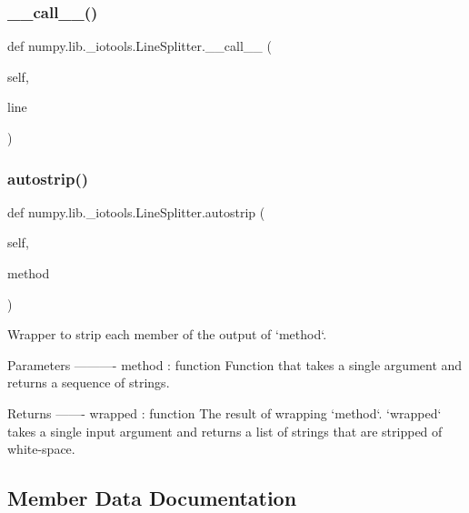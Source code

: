 \subsubsection{\texorpdfstring{\+\_\+\+\_\+call\+\_\+\+\_\+()}{\_\_call\_\_()}}
{\footnotesize\ttfamily def numpy.\+lib.\+\_\+iotools.\+Line\+Splitter.\+\_\+\+\_\+call\+\_\+\+\_\+ (\begin{DoxyParamCaption}\item[{}]{self,  }\item[{}]{line }\end{DoxyParamCaption})}

\mbox{\label{classnumpy_1_1lib_1_1__iotools_1_1LineSplitter_a1b01934e53f08697ddf883dba06e4f47}} 
\subsubsection{\texorpdfstring{autostrip()}{autostrip()}}
{\footnotesize\ttfamily def numpy.\+lib.\+\_\+iotools.\+Line\+Splitter.\+autostrip (\begin{DoxyParamCaption}\item[{}]{self,  }\item[{}]{method }\end{DoxyParamCaption})}

\begin{DoxyVerb}Wrapper to strip each member of the output of `method`.

Parameters
----------
method : function
    Function that takes a single argument and returns a sequence of
    strings.

Returns
-------
wrapped : function
    The result of wrapping `method`. `wrapped` takes a single input
    argument and returns a list of strings that are stripped of
    white-space.\end{DoxyVerb}
 

\subsection{Member Data Documentation}
\mbox{\label{classnumpy_1_1lib_1_1__iotools_1_1LineSplitter_acac01271b5da3339deedb3d537952a73}} 
